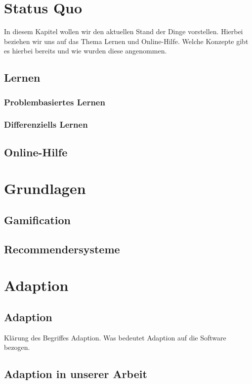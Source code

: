 
\chapter{Status Quo}
In diesem Kapitel wollen wir den aktuellen Stand der Dinge vorstellen. Hierbei beziehen wir uns auf das Thema Lernen und Online-Hilfe. Welche Konzepte gibt es hierbei bereits und wie wurden diese angenommen.

\section{Lernen}
\subsection{Problembasiertes Lernen}
\subsection{Differenziells Lernen}

\section{Online-Hilfe}


\chapter{Grundlagen}
\section{Gamification}

\section{Recommendersysteme}

\chapter{Adaption}
\label{ch:Content1}

\section{Adaption}
Klärung des Begriffes Adaption. Was bedeutet Adaption auf die Software bezogen.

\section{Adaption in unserer Arbeit}

